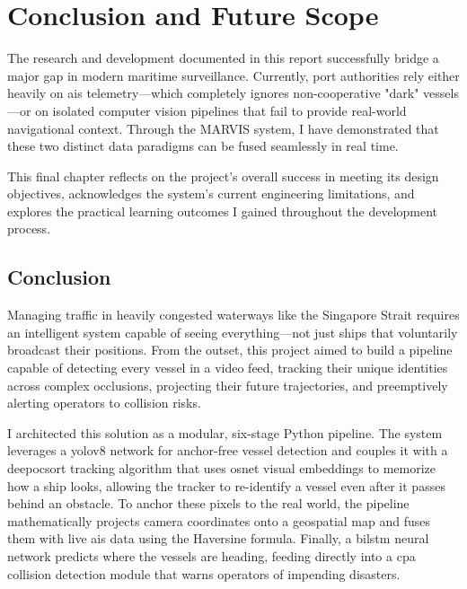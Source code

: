 
\chapter{Conclusion and Future Scope}

The research and development documented in this report successfully bridge a major gap in modern maritime surveillance. Currently, port authorities rely either heavily on \gls{ais} telemetry—which completely ignores non-cooperative "dark" vessels—or on isolated computer vision pipelines that fail to provide real-world navigational context. Through the MARVIS system, I have demonstrated that these two distinct data paradigms can be fused seamlessly in real time. 

This final chapter reflects on the project's overall success in meeting its design objectives, acknowledges the system's current engineering limitations, and explores the practical learning outcomes I gained throughout the development process.

\section{Conclusion}

Managing traffic in heavily congested waterways like the Singapore Strait requires an intelligent system capable of seeing everything—not just ships that voluntarily broadcast their positions. From the outset, this project aimed to build a pipeline capable of detecting every vessel in a video feed, tracking their unique identities across complex occlusions, projecting their future trajectories, and preemptively alerting operators to collision risks. 

I architected this solution as a modular, six-stage Python pipeline. The system leverages a \gls{yolov8} network for anchor-free vessel detection and couples it with a \gls{deepocsort} tracking algorithm that uses \gls{osnet} visual embeddings to memorize how a ship looks, allowing the tracker to re-identify a vessel even after it passes behind an obstacle. To anchor these pixels to the real world, the pipeline mathematically projects camera coordinates onto a geospatial map and fuses them with live \gls{ais} data using the Haversine formula. Finally, a \gls{bilstm} neural network predicts where the vessels are heading, feeding directly into a \gls{cpa} collision detection module that warns operators of impending disasters.

